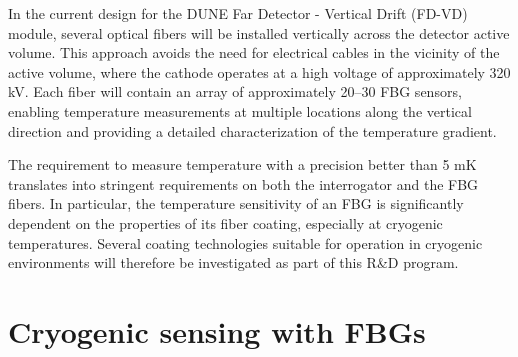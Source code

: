 \documentclass[preprint,11pt]{elsarticle}
\begin{document}
In the current design for the DUNE Far Detector - Vertical Drift (FD-VD) module, several optical fibers will be installed vertically across the detector active volume. This approach avoids the need for electrical cables in the vicinity of the active volume, where the cathode operates at a high voltage of approximately 320 kV. Each fiber will contain an array of approximately 20–30 FBG sensors, enabling temperature measurements at multiple locations along the vertical direction and providing a detailed characterization of the temperature gradient.

The requirement to measure temperature with a precision better than 5 mK translates into stringent requirements on both the interrogator and the FBG fibers. In particular, the temperature sensitivity of an FBG is significantly dependent on the properties of its fiber coating, especially at cryogenic temperatures. Several coating technologies suitable for operation in cryogenic environments will therefore be investigated as part of this R\&D program.



\section{Cryogenic sensing with FBGs}
\label{sec:fbgs}

\end{document}
